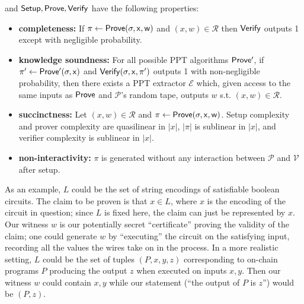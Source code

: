 \noindent and $\sf{Setup}, \sf{Prove}, \sf{Verify}$ have the following properties:
\begin{itemize}
    \item \textbf{completeness:} If $\pi \leftarrow \sf{Prove}(\sigma, x, w)$ and $(x, w) \in \mathcal{R}$ then $\sf{Verify}$ outputs 1 except with negligible probability.
    \item \textbf{knowledge soundness:} For all possible PPT algorithms $\sf{Prove'}$, if $\pi' \leftarrow \sf{Prove'}(\sigma, x)$ and $\sf{Verify}(\sigma, x, \pi')$ outputs 1 with non-negligible probability, then there exists a PPT extractor $\mathcal{E}$ which, given access to the same inputs as $\sf{Prove}$ and $\mathcal{P}$'s random tape, outputs $w$ s.t. $(x, w) \in \mathcal{R}$. 
    \item \textbf{succinctness:} Let $(x, w) \in \mathcal{R}$ and $\pi \leftarrow \sf{Prove}(\sigma, x, w)$. Setup complexity and prover complexity are quasilinear in $|x|$, $|\pi|$ is sublinear in $|x|$, and verifier complexity is sublinear in $|x|$.
    \item \textbf{non-interactivity:} $\pi$ is generated without any interaction between $\mathcal{P}$ and $\mathcal{V}$ after setup.
\end{itemize}

\noindent As an example, $L$ could be the set of string encodings of satisfiable boolean circuits. The claim to be proven is that $x \in L$, where $x$ is the encoding of the circuit in question; since $L$ is fixed here, the claim can just be represented by $x$. Our witness $w$ is our potentially secret ``certificate'' proving the validity of the claim; one could generate $w$ by ``executing'' the circuit on the satisfying input, recording all the values the wires take on in the process. In a more realistic setting, $L$ could be the set of tuples $(P, x, y, z)$ corresponding to on-chain programs $P$ producing the output $z$ when executed on inputs $x, y$. Then our witness $w$ could contain $x, y$ while our statement (``the output of $P$ is $z$'') would be $(P, z)$. 

